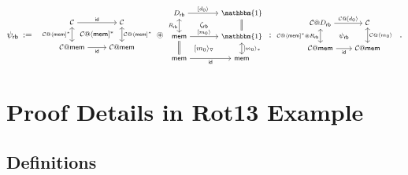 \documentclass[acmsmall,screen,review,anonymous,nonacm]{acmart}
\newcommand{\kw}[1]{\ensuremath{ \mathsf{#1} }}
\newcommand{\sepconj}{\oast}
\begin{document}
\[
  \psi_\kw{rb} \: := \:
{\footnotesize
  \begin{array}{c}
    \begin{tikzcd}[row sep=0.5ex, column sep=-3.5ex]
      \mathcal{C} \ar[dd, leftrightarrow, "\mathcal{C} @ \langle\kw{mem}{]}^*"']
      \ar[rr, "\kw{id}"]
       &&
      \mathcal{C} \ar[dd, leftrightarrow, "\mathcal{C} @ \langle\kw{mem}{]}^*"] \\
      & \mathcal{C} @ \langle \kw{mem} ]^* & \\
      \mathcal{C} @ \kw{mem} \ar[rr, "\kw{id}"']  && \mathcal{C} @ \kw{mem}
    \end{tikzcd}
  \end{array}
  \!\!
  \sepconj
  \!\!
  \begin{array}{c}
    \begin{tikzcd}[row sep=0ex, column sep=0.5ex]
      D_\kw{rb} \ar[dd, leftrightarrow, "R_\kw{rb}"']
      \ar[rr, "{[}d_0\rangle"] &&
      \mathbbm{1} \ar[dd, equal] \\
      & \zeta_\kw{rb} & \\
      \kw{mem}\ar[rr, "{[}m_0\rangle"]\ar[dd, equal]  && \mathbbm{1}
      \ar[dd, leftrightarrow, "{[} m_0\rangle_*"] \\
      & {[m_0 \rangle_\triangledown} & \\
      \kw{mem}\ar[rr, "\kw{id}"']  && \kw{mem}
    \end{tikzcd}
  \end{array}
  \!\! : \!\!
  \begin{array}{c}
    \begin{tikzcd}[row sep=0.5ex, column sep=0ex]
      \mathcal{C} @ D_\kw{rb} \ar[dd, leftrightarrow,
      "\mathcal{C} @ \langle\kw{mem}{]}^* \sepconj R_\kw{rb}"']
      \ar[rr, "\mathcal{C} @ {[}d_0 \rangle"]
       &&
      \mathcal{C} \ar[dd, leftrightarrow, "\mathcal{C} @ \langle m_0 \rangle"] \\
      & \psi_\kw{rb} & \\
      \mathcal{C} @ \kw{mem} \ar[rr, "\kw{id}"']  && \mathcal{C} @ \kw{mem}
    \end{tikzcd}
  \end{array}
  }
  \,.
\]


\section{Proof Details in Rot13 Example}
\label{app:proof-rot13} %

\subsection{Definitions}
\end{document}
